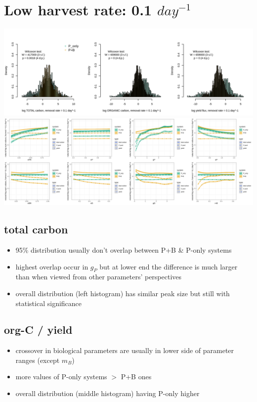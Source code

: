 \documentclass[a4paper]{article}
\begin{document}
\section{Low harvest rate: 0.1 $day^{-1}$}
\includegraphics[width=\linewidth]{../result/sys_01.png}\\
\includegraphics[width=\linewidth]{../result/var_01.png}\\

\subsection{total carbon}
\begin{itemize}
    \item 95\% distribution usually don't overlap between P+B \& P-only systems
    \item highest overlap occur in $g_P$ but at lower end the difference is much larger than when viewed from other parameters' perspectives
    \item overall distribution (left histogram) has similar peak size but still with statistical significance
\end{itemize}

\subsection{org-C / yield}
\begin{itemize}
    \item crossover in biological parameters are usually in lower side of parameter ranges (except $m_B$)
    \item more values of P-only systems $>$ P+B ones
    \item overall distribution (middle histogram) having P-only higher
\end{itemize}
\end{document}
